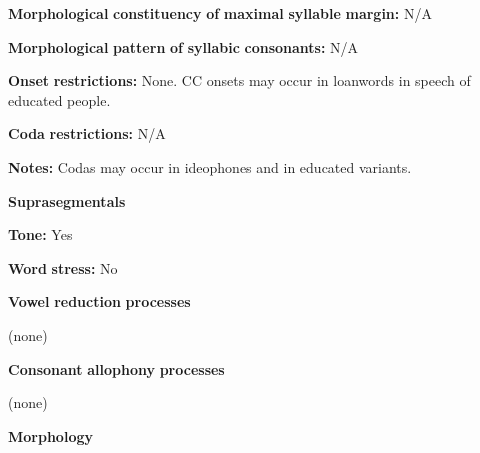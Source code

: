 \documentclass[output=paper]{langsci/langscibook}
\begin{document}
\begin{styleBody}
\textbf{Morphological} \textbf{constituency} \textbf{of} \textbf{maximal} \textbf{syllable} \textbf{margin:} N/A
\end{styleBody}

\begin{styleBody}
\textbf{Morphological} \textbf{pattern} \textbf{of} \textbf{syllabic} \textbf{consonants:} N/A
\end{styleBody}

\begin{styleBody}
\textbf{Onset} \textbf{restrictions:} None. CC onsets may occur in loanwords in speech of educated people.
\end{styleBody}

\begin{styleBody}
\textbf{Coda} \textbf{restrictions:} N/A
\end{styleBody}

\begin{styleBody}
\textbf{Notes:} Codas may occur in ideophones and in educated variants.
\end{styleBody}

\begin{styleBody}
\textbf{Suprasegmentals}
\end{styleBody}

\begin{styleBody}
\textbf{Tone:} Yes
\end{styleBody}

\begin{styleBody}
\textbf{Word} \textbf{stress:} No
\end{styleBody}

\begin{styleBody}
\textbf{Vowel} \textbf{reduction} \textbf{processes}
\end{styleBody}

\begin{styleBody}
(none)
\end{styleBody}

\begin{styleBody}
\textbf{Consonant} \textbf{allophony} \textbf{processes}
\end{styleBody}

\begin{styleBody}
(none)
\end{styleBody}

\begin{styleBody}
\textbf{Morphology}
\end{styleBody}
\end{document}
